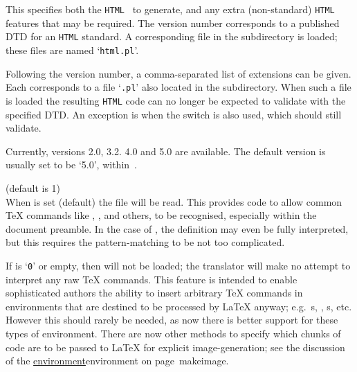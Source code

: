 \begin{htmllist}%
%
%
%
\item [ -html\_version \texttt{(2.0|3.2|4.0|5.0)[,(math|i18n)]*}\label{cs_htmlversion}]
~\\\\
This specifies both the \texttt{HTML}~ to generate, 
and any extra (non-standard) \texttt{HTML} features that may be required.\html{\\}
The version number corresponds to a published DTD for an \texttt{HTML} standard.
A corresponding \Perl{} file in the  subdirectory is loaded;
these files are named `\texttt{html}\texttt{.pl}'.

Following the version number, a comma-separated list of extensions
can be given. Each corresponds to a file `\texttt{.pl}' 
also located in the  subdirectory. 
When such a file is loaded the resulting \texttt{HTML} code 
can no longer be expected to validate with the specified DTD. 
An exception is  when the  
switch is also used, which should still validate.

Currently, versions 2.0, 3.2. 4.0 and 5.0 are available.
The default version is usually set to be `5.0', within \,.%

%
%

\item [ -no\_tex\_defs\label{cs_notexdefs}]
 (default is 1)\\
When  is set (default) the file  will be read.
This provides code to allow common \TeX{} commands like , ,
 and others, to be recognised, especially within the document preamble.
In the case of , the definition may even be fully interpreted,
but this requires the pattern-matching to be not too complicated.

If  is `\texttt{0}' or empty, then  will not be loaded;
the translator will make no attempt to interpret any raw \TeX{} commands.  
This feature is intended to enable sophisticated authors the ability to insert 
arbitrary \TeX{} commands in environments that are destined 
to be processed by \LaTeX{} anyway; 
e.g.\ s, , s, etc.
However this should rarely be needed, as now there is better support for these
types of environment. There are now other methods to specify which chunks of code 
are to be passed to \LaTeX{} for explicit image-generation; 
see the discussion of the  
\hyperref[page]{environment}{environment on page~}{}{makeimage}.



\end{htmllist}
